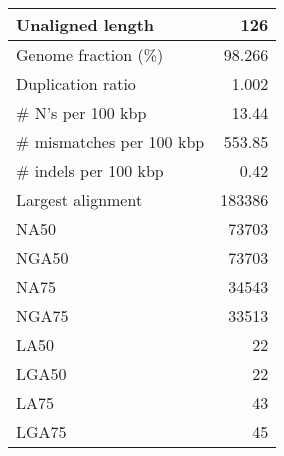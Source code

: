 \documentclass[12pt,a4paper]{article}
\begin{document}
\begin{table}[ht]
\begin{center}
\begin{tabular}{|l*{1}{|r}|}
Unaligned length & 126 \\ \hline
Genome fraction (\%) & 98.266 \\ \hline
Duplication ratio & 1.002 \\ \hline
\# N's per 100 kbp & 13.44 \\ \hline
\# mismatches per 100 kbp & 553.85 \\ \hline
\# indels per 100 kbp & 0.42 \\ \hline
Largest alignment & 183386 \\ \hline
NA50 & 73703 \\ \hline
NGA50 & 73703 \\ \hline
NA75 & 34543 \\ \hline
NGA75 & 33513 \\ \hline
LA50 & 22 \\ \hline
LGA50 & 22 \\ \hline
LA75 & 43 \\ \hline
LGA75 & 45 \\ \hline
\end{tabular}
\end{center}
\end{table}
\end{document}
